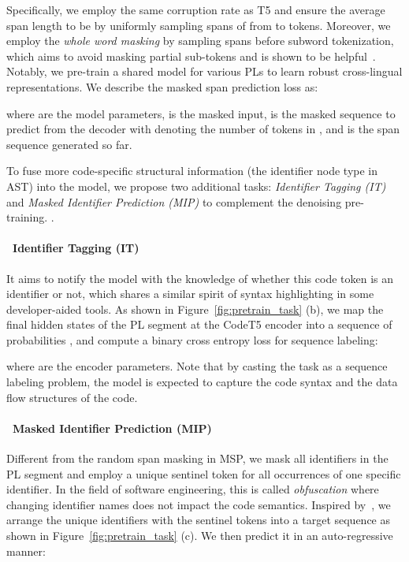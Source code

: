 \documentclass[11pt]{article}
\begin{document}
Specifically, we employ the same  corruption rate as T5 and ensure the average span length to be  by uniformly sampling spans of from  to  tokens. Moreover, we employ the \emph{whole word masking} by sampling spans  before subword tokenization, which aims to avoid masking partial sub-tokens and is shown to be helpful~\cite{DBLP:journals/corr/abs-1904-09223}. 
Notably, we pre-train a shared model for various PLs to learn robust  cross-lingual representations. 
We  describe  the masked span prediction loss as:


\noindent where  are the model parameters,  is the masked input,  is the masked sequence to predict from the decoder with  denoting the number of tokens in , and  is the span sequence generated so far.
 
 To fuse more code-specific structural information (the identifier node type in AST) into the model, we propose two additional tasks: \textit{Identifier Tagging (IT)} and \textit{Masked Identifier Prediction (MIP)} to complement the denoising pre-training.
.
 
\paragraph{~Identifier Tagging (IT)} 
It aims to notify the model with the knowledge of whether this code token is an identifier or not, which shares a similar spirit of syntax highlighting in some developer-aided tools.
As shown in Figure~\ref{fig:pretrain_task} (b), we map the final hidden states of the PL segment at the CodeT5 encoder into a sequence of probabilities , and compute a binary cross entropy loss for sequence labeling:
 
\noindent where  are the encoder parameters. Note that by casting the task as a sequence labeling problem, the model is expected to capture the code syntax and the data flow structures of the code.
 
\paragraph{~Masked Identifier Prediction (MIP)} 
Different from the random span masking in MSP, we mask all identifiers in the PL segment and employ a unique sentinel token for all occurrences of one specific identifier. In the field of software engineering, this is called \emph{obfuscation} where changing identifier names does not impact the code semantics.  Inspired by~\citet{DBLP:journals/corr/abs-2102-07492}, we arrange the unique identifiers with the sentinel tokens into  a target sequence  as shown in Figure~\ref{fig:pretrain_task} (c).
We then predict it in an auto-regressive manner:
\end{document}
